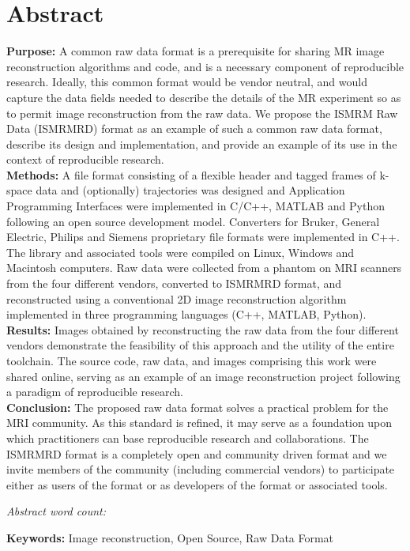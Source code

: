 \documentclass[12pt]{article}
\begin{document}
\section*{Abstract}
\textbf{Purpose:} A common raw data format is a prerequisite for sharing MR image reconstruction algorithms and code, and is a necessary component of reproducible research.  Ideally, this common format would be vendor neutral, and would capture the data fields needed to describe the details of the MR experiment so as to permit image reconstruction from the raw data.  We propose the ISMRM Raw Data (ISMRMRD) format as an example of such a common raw data format, describe its design and implementation, and provide an example of its use in the context of reproducible research.\\
\textbf{Methods:} A file format consisting of a flexible header and tagged frames of k-space data and (optionally) trajectories was designed and  Application Programming Interfaces were implemented in C/C++, MATLAB and Python following an open source development model.  Converters for Bruker, General Electric, Philips and Siemens proprietary file formats were implemented in C++. The library and associated tools were compiled on Linux, Windows and Macintosh computers. Raw data were collected from a phantom on MRI scanners from the four different vendors, converted to ISMRMRD format, and reconstructed using a conventional 2D image reconstruction algorithm implemented in three programming languages (C++, MATLAB, Python).\\
\textbf{Results:} Images obtained by reconstructing the raw data from the four different vendors demonstrate the feasibility of this approach and the utility of the entire toolchain.  The source code, raw data, and images comprising this work were shared online, serving as an example of an image reconstruction project following a paradigm of reproducible research.\\
\textbf{Conclusion:} The proposed raw data format solves a practical problem
for the MRI community.  As this standard is refined, it may serve as a foundation upon which practitioners can base reproducible research and collaborations.  The ISMRMRD format is a completely open and community driven format and we invite members of the community (including commercial vendors) to participate either as users of the format or as developers of the format or associated tools.

\textit{Abstract word count: }  

\textbf{Keywords:}  Image reconstruction, Open Source, Raw Data Format
\end{document}
